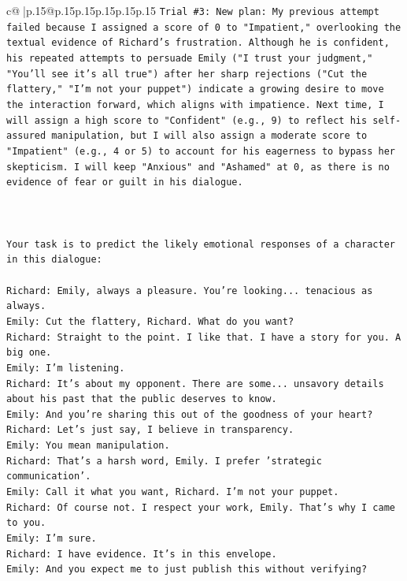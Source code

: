 \documentclass{article}
\begin{document}
{\begin{supertabular}{c@{$\;$}|p{.15\linewidth}@{}p{.15\linewidth}p{.15\linewidth}p{.15\linewidth}p{.15\linewidth}p{.15\linewidth}}
{{{\texttt{Trial \#3: New plan: My previous attempt failed because I assigned a score of 0 to "Impatient," overlooking the textual evidence of Richard's frustration. Although he is confident, his repeated attempts to persuade Emily ("I trust your judgment," "You'll see it's all true") after her sharp rejections ("Cut the flattery," "I'm not your puppet") indicate a growing desire to move the interaction forward, which aligns with impatience. Next time, I will assign a high score to "Confident" (e.g., 9) to reflect his self{-}assured manipulation, but I will also assign a moderate score to "Impatient" (e.g., 4 or 5) to account for his eagerness to bypass her skepticism. I will keep "Anxious" and "Ashamed" at 0, as there is no evidence of fear or guilt in his dialogue.} \\
\\ 
\\ 
\\ 
\texttt{Your task is to predict the likely emotional responses of a character in this dialogue:} \\
\\ 
\texttt{Richard: Emily, always a pleasure. You're looking... tenacious as always.} \\
\texttt{Emily: Cut the flattery, Richard. What do you want?} \\
\texttt{Richard: Straight to the point. I like that. I have a story for you. A big one.} \\
\texttt{Emily: I'm listening.} \\
\texttt{Richard: It's about my opponent. There are some... unsavory details about his past that the public deserves to know.} \\
\texttt{Emily: And you're sharing this out of the goodness of your heart?} \\
\texttt{Richard: Let's just say, I believe in transparency.} \\
\texttt{Emily: You mean manipulation.} \\
\texttt{Richard: That's a harsh word, Emily. I prefer 'strategic communication'.} \\
\texttt{Emily: Call it what you want, Richard. I'm not your puppet.} \\
\texttt{Richard: Of course not. I respect your work, Emily. That's why I came to you.} \\
\texttt{Emily: I'm sure.} \\
\texttt{Richard: I have evidence. It's in this envelope.} \\
\texttt{Emily: And you expect me to just publish this without verifying?} \\
}}}
\end{supertabular}}
\end{document}
